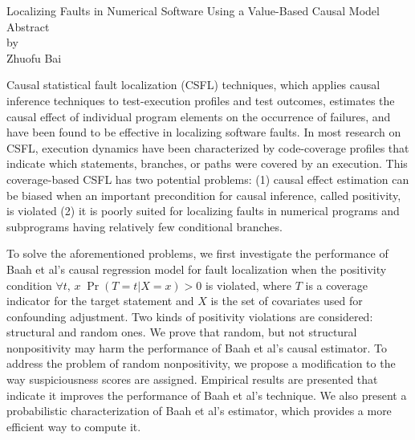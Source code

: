 \newpage
\begin{centering}
  Localizing Faults in Numerical Software Using a Value-Based Causal Model
  \\
  \vspace{1cm}
  Abstract\\
  by\\
  \vspace{1cm}
  Zhuofu Bai\\
  \vspace{1cm}
\end{centering}



Causal statistical fault localization (CSFL) techniques,  which applies causal inference techniques to test-execution profiles and test outcomes, estimates the causal effect of individual program elements on the occurrence of failures, and have been found to be effective in localizing software faults. In most research on CSFL, execution dynamics have been characterized by code-coverage profiles that indicate which statements, branches, or paths were covered by an execution. This coverage-based CSFL has two potential problems: (1) causal effect estimation can be biased when an important precondition for causal inference, called positivity, is violated  (2) it is poorly suited for localizing faults in numerical programs and subprograms having relatively few conditional branches.
 
To solve the aforementioned problems, we first investigate the performance of Baah et al's causal regression model for fault localization when the positivity condition $\forall t,\,x\;\Pr (T = t|X = x) > 0$ is violated, where $T$ is a coverage indicator for the target statement and  $X$ is the set of covariates used for confounding adjustment.  Two kinds of positivity violations are considered: structural and random ones.  We prove that random, but not structural nonpositivity may harm the performance of Baah et al's causal estimator.  To address the problem of random nonpositivity, we propose a modification to the way suspiciousness scores are assigned.  Empirical results are presented that indicate it improves the performance of Baah et al's technique. We also present a probabilistic characterization of Baah et al's estimator, which provides a more efficient way to compute it.
 
